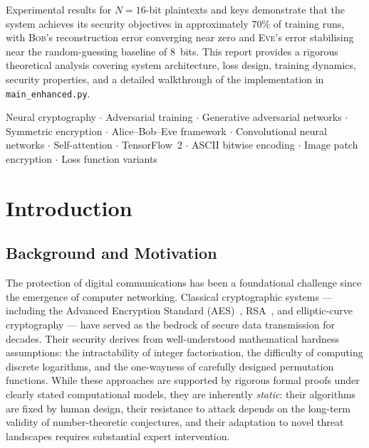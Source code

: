 \documentclass[12pt, a4paper]{article}
\newcommand{\bob}{\textsc{Bob}}
\newcommand{\eve}{\textsc{Eve}}
\newcommand{\code}[1]{\texttt{\color{CodeRed}#1}}
\newcommand{\N}{N}                 %
\begin{document}
Experimental results for $\N = 16$-bit plaintexts and keys demonstrate
that the system achieves its security objectives in approximately 70\% of
training runs, with \bob{}'s reconstruction error converging near zero and
\eve{}'s error stabilising near the random-guessing baseline of 8~bits.
This report provides a rigorous theoretical analysis covering system
architecture, loss design, training dynamics, security properties, and a
detailed walkthrough of the implementation in \code{main\_enhanced.py}.

\bigskip
\noindent
\begin{tcolorbox}[contribbox, title={Keywords}]
  Neural cryptography $\cdot$ Adversarial training $\cdot$
  Generative adversarial networks $\cdot$ Symmetric encryption $\cdot$
  Alice--Bob--Eve framework $\cdot$ Convolutional neural networks $\cdot$
  Self-attention $\cdot$ TensorFlow~2 $\cdot$ ASCII bitwise encoding $\cdot$
  Image patch encryption $\cdot$ Loss function variants
\end{tcolorbox}

\newpage
\section{Introduction}
\label{sec:intro}

\subsection{Background and Motivation}
\label{subsec:background}

The protection of digital communications has been a foundational challenge
since the emergence of computer networking. Classical cryptographic
systems — including the Advanced Encryption Standard
(AES)~\cite{daemen2002aes}, RSA~\cite{rivest1978rsa}, and elliptic-curve
cryptography — have served as the bedrock of secure data transmission for
decades. Their security derives from well-understood mathematical hardness
assumptions: the intractability of integer factorisation, the difficulty
of computing discrete logarithms, and the one-wayness of carefully
designed permutation functions. While these approaches are supported by
rigorous formal proofs under clearly stated computational models, they are
inherently \emph{static}: their algorithms are fixed by human design,
their resistance to attack depends on the long-term validity of
number-theoretic conjectures, and their adaptation to novel threat
landscapes requires substantial expert intervention.
\end{document}
